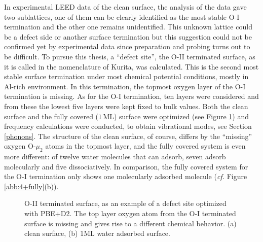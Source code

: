 \documentclass[11pt,DIV=13,BCOR=5mm,a4paper,headinclude]{scrbook}
\begin{document}
In experimental LEED data of the clean surface, the analysis of the data gave two sublattices, one of them can be clearly identified as the most stable O-I termination and the other one remains unidentified.
This unknown lattice could be a defect side or another surface termination but this suggestion could not be confirmed yet by experimental data since preparation and probing turns out to be difficult.
To pursue this thesis, a ``defect site'', the O-II terminated surface, as it is called in the nomenclature of Kurita\cite{kuri10}, was calculated.
This is the second most stable surface termination under most chemical potential conditions, mostly in Al-rich environment.
In this termination, the topmost oxygen layer of the O-I termination is missing.
As for the O-I termination, ten layers were considered and from these the lowest five layers were kept fixed to bulk values.
Both the clean surface and the fully covered ($1\,$ML) surface were optimized (see Figure \ref{abb:O-II-geom}) and frequency calculations were conducted, to obtain vibrational modes, see Section \ref{phonons}.
The structure of the clean surface, of course, differs by the ``missing'' oxygen O-$\mu_2$ atoms in the topmost layer, and the fully covered system is even more different: of twelve water molecules that can adsorb, seven adsorb molecularly and five dissociatively.
In comparison, the fully covered system for the O-I termination only shows one molecularly adsorbed molecule (\textit{cf.} Figure \ref{abb:4+fully}(b)).
 \begin{figure}[!ht]
 \centering
{}
 \quad\quad
 \caption{O-II terminated surface, as an example of a defect site optimized with PBE+D2.
The top layer oxygen atom from the O-I terminated surface is missing and gives rise to a different chemical behavior.
(a) clean surface, (b) 1ML water adsorbed surface.}
        \label{abb:O-II-geom}
 \end{figure}
\end{document}

